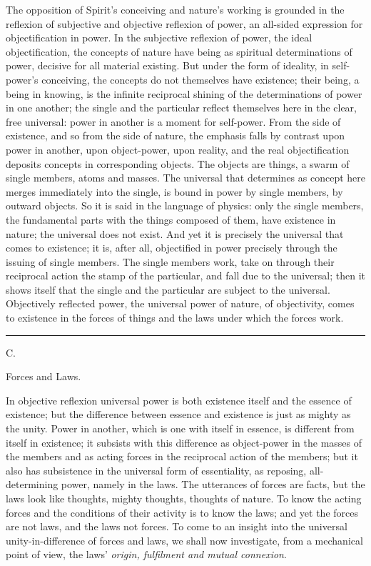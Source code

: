 \documentclass[12pt,a4paper]{book}
\newcommand{\afdeling}[2]{%
  \par\vspace{1.3\baselineskip}%
  {\centering #1\par\vspace{0.2\baselineskip}\normalsize #2\par}%
  \addcontentsline{toc}{section}{#1 #2}%
  \vspace{0.8\baselineskip}\par\nointerlineskip}
\newcommand{\streg}{\begin{center}\rule{2cm}{0.4pt}\end{center}}
\begin{document}
The opposition of Spirit's conceiving and nature's working is grounded in the
reflexion of subjective and objective reflexion of power, an all-sided expression for
objectification in power. In the subjective reflexion of power, the ideal
objectification, the concepts of nature have being as spiritual determinations of
power, decisive for all material existing. But under the form of ideality, in
self-power's conceiving, the concepts do not themselves have existence; their being,
a being in knowing, is the infinite reciprocal shining of the determinations of power
in one another; the single and the particular reflect themselves here in the clear,
free universal: power in another is a moment for self-power. From the side of
existence, and so from the side of nature, the emphasis falls by contrast upon power
in another, upon object-power, upon reality, and the real objectification deposits
concepts in corresponding objects. The objects are things, a swarm of single members,
atoms and masses. The universal that determines as concept here merges immediately
into the single, is bound in power by single members, by outward objects. So it is
said in the language of physics: only the single members, the fundamental parts with
the things composed of them, have existence in nature; the universal does not exist.
And yet it is precisely the universal that comes to existence; it is, after all,
objectified in power precisely through the issuing of single members. The single
members work, take on through their reciprocal action the stamp of the particular,
and fall due to the universal; then it shows itself that the single and the
particular are subject to the universal. Objectively reflected power, the universal
power of nature, of objectivity, comes to existence in the forces of things and the
laws under which the forces work.

\streg

\afdeling{C.}{Forces and Laws.}

In objective reflexion universal power is both existence itself and the essence of
existence; but the difference between essence and existence is just as mighty as
the unity. Power in another, which is one with itself in essence, is different from
itself in existence; it subsists with this difference as object-power in the masses
of the members and as acting forces in the reciprocal action of the members; but it
also has subsistence in the universal form of essentiality, as reposing,
all-determining power, namely in the laws. The utterances of forces are facts, but
the laws look like thoughts, mighty thoughts, thoughts of nature. To know the acting
forces and the conditions of their activity is to know the laws; and yet the forces
are not laws, and the laws not forces. To come to an insight into the universal
unity-in-difference of forces and laws, we shall now investigate, from a mechanical
point of view, the laws'
\emph{origin, fulfilment and mutual connexion}.
\end{document}
